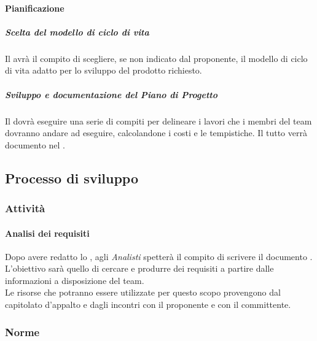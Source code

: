 			\paragraph{Pianificazione}
				\subparagraph{Scelta del modello di ciclo di vita}
Il \roleProjectManager{} avrà il compito di scegliere, se non indicato dal proponente\gloss{}, il modello di ciclo di vita adatto per lo sviluppo del prodotto richiesto.
				\subparagraph{Sviluppo e documentazione del Piano di Progetto}
Il \roleProjectManager{} dovrà eseguire una serie di compiti per delineare i lavori che i membri del team dovranno andare ad eseguire, calcolandone i costi e le tempistiche. Il tutto verrà documento nel \docNameVersionPdP{}.
		
	\subsection{Processo di sviluppo}
		\subsubsection{Attività}
			\paragraph{Analisi dei requisiti}
Dopo avere redatto lo \docNameSdF{}, agli \emph{Analisti} spetterà il compito di scrivere il documento \docNameVersionAdR{}. \\
L'obiettivo sarà quello di cercare e produrre dei requisiti a partire dalle informazioni a disposizione del team. \\
Le risorse che potranno essere utilizzate per questo scopo provengono dal capitolato d'appalto e dagli incontri con il proponente\gloss{} e con il committente\gloss{}. \\

		\subsubsection{Norme}
